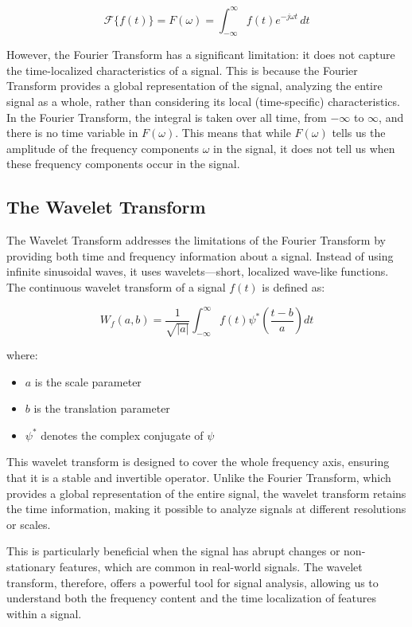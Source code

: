 \begin{equation}
  \mathcal{F}\{f(t)\} = F(\omega) = \int_{-\infty}^{\infty} f(t) e^{-j\omega t} \, dt
  \label{eq:fourier}
\end{equation}

However, the Fourier Transform has a significant limitation: it does not capture the time-localized characteristics of a signal. This is because the Fourier Transform provides a global representation of the signal, analyzing the entire signal as a whole, rather than considering its local (time-specific) characteristics. In the Fourier Transform, the integral is taken over all time, from $-\infty$ to $\infty$, and there is no time variable in $F(\omega)$. This means that while $F(\omega)$ tells us the amplitude of the frequency components $\omega$ in the signal, it does not tell us when these frequency components occur in the signal.

\subsection{The Wavelet Transform}

The Wavelet Transform addresses the limitations of the Fourier Transform by providing both time and frequency information about a signal. Instead of using infinite sinusoidal waves, it uses wavelets---short, localized wave-like functions. The continuous wavelet transform of a signal $f(t)$ is defined as:

\begin{equation}
  W_f(a,b) = \frac{1}{\sqrt{|a|}} \int_{-\infty}^{\infty} f(t) \psi^*\!\left(\frac{t-b}{a}\right) dt
  \label{eq:wavelet}
\end{equation}

where:
\begin{itemize}
  \item $a$ is the scale parameter
  \item $b$ is the translation parameter
  \item $\psi^*$ denotes the complex conjugate of $\psi$
\end{itemize}

This wavelet transform is designed to cover the whole frequency axis, ensuring that it is a stable and invertible operator. Unlike the Fourier Transform, which provides a global representation of the entire signal, the wavelet transform retains the time information, making it possible to analyze signals at different resolutions or scales.

This is particularly beneficial when the signal has abrupt changes or non-stationary features, which are common in real-world signals. The wavelet transform, therefore, offers a powerful tool for signal analysis, allowing us to understand both the frequency content and the time localization of features within a signal.

